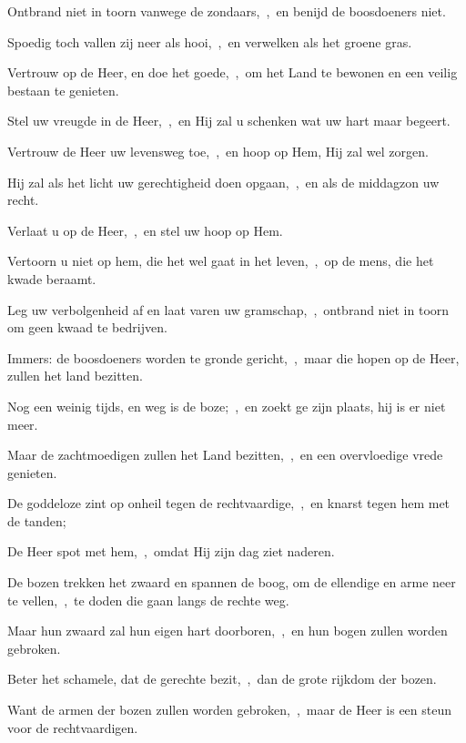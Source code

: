 \documentclass[12pt,twoside,a5paper]{article}
\begin{document}
\begin{halfparskip}

   Ontbrand niet in toorn vanwege de zondaars,~\sep\ en benijd de boosdoeners niet.


  Spoedig toch vallen zij neer als hooi,~\sep\ en verwelken als het groene gras.

  Vertrouw op de Heer, en doe het goede,~\sep\ om het Land te bewonen en een veilig bestaan te genieten.

  Stel uw vreugde in de Heer,~\sep\ en Hij zal u schenken wat uw hart maar begeert.

  Vertrouw de Heer uw levensweg toe,~\sep\ en hoop op Hem, Hij zal wel zorgen.

  Hij zal als het licht uw gerechtigheid doen opgaan,~\sep\ en als de middagzon uw recht.

  Verlaat u op de Heer,~\sep\ en stel uw hoop op Hem.

  Vertoorn u niet op hem, die het wel gaat in het leven,~\sep\ op de mens, die het kwade beraamt.

  Leg uw verbolgenheid af en laat varen uw gramschap,~\sep\ ontbrand niet in toorn om geen kwaad te bedrijven.

  Immers: de boosdoeners worden te gronde gericht,~\sep\ maar die hopen op de Heer, zullen het land bezitten.

  Nog een weinig tijds, en weg is de boze;~\sep\ en zoekt ge zijn plaats, hij is er niet meer.

  Maar de zachtmoedigen zullen het Land bezitten,~\sep\ en een overvloedige vrede genieten.

  De goddeloze zint op onheil tegen de rechtvaardige,~\sep\ en knarst tegen hem met de tanden;

  De Heer spot met hem,~\sep\ omdat Hij zijn dag ziet naderen.

  De bozen trekken het zwaard en spannen de boog, om de ellendige en arme neer te vellen,~\sep\ te doden die gaan langs de rechte weg.

  Maar hun zwaard zal hun eigen hart doorboren,~\sep\ en hun bogen zullen worden gebroken.

  Beter het schamele, dat de gerechte bezit,~\sep\ dan de grote rijkdom der bozen.

  Want de armen der bozen zullen worden gebroken,~\sep\ maar de Heer is een steun voor de rechtvaardigen.


\end{halfparskip}
\end{document}
